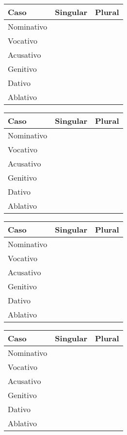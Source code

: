 \documentclass[12pt, twocolumn, a4paper, article]{article}
\numberwithin{equation}{section}
\begin{document}
\begin{table}
\centering
\begin{tabular}[!ht]{|l|p{2.5cm}|p{2.5cm}|} 
\hline \hline
Caso & \multicolumn{1}{c|}{Singular} & \multicolumn{1}{c|}{Plural}  \\
\hline
Nominativo &  & \\ \hline
Vocativo   &  & \\ \hline
Acusativo  &  & \\ \hline
Genitivo   &  & \\ \hline
Dativo     &  & \\ \hline
Ablativo   &  & \\
\hline \hline
\end{tabular}
\end{table}

\begin{table}
\centering
\begin{tabular}[!ht]{|l|p{2.5cm}|p{2.5cm}|} 
\hline \hline
Caso & \multicolumn{1}{c|}{Singular} & \multicolumn{1}{c|}{Plural}  \\
\hline
Nominativo &  & \\ \hline
Vocativo   &  & \\ \hline
Acusativo  &  & \\ \hline
Genitivo   &  & \\ \hline
Dativo     &  & \\ \hline
Ablativo   &  & \\
\hline \hline
\end{tabular}
\end{table}

\begin{table}
\centering
\begin{tabular}[!ht]{|l|p{2.5cm}|p{2.5cm}|} 
\hline \hline
Caso & \multicolumn{1}{c|}{Singular} & \multicolumn{1}{c|}{Plural}  \\
\hline
Nominativo &  & \\ \hline
Vocativo   &  & \\ \hline
Acusativo  &  & \\ \hline
Genitivo   &  & \\ \hline
Dativo     &  & \\ \hline
Ablativo   &  & \\
\hline \hline
\end{tabular}
\end{table}

\begin{table}
\centering
\begin{tabular}[!ht]{|l|p{2.5cm}|p{2.5cm}|} 
\hline \hline
Caso & \multicolumn{1}{c|}{Singular} & \multicolumn{1}{c|}{Plural}  \\
\hline
Nominativo &  & \\ \hline
Vocativo   &  & \\ \hline
Acusativo  &  & \\ \hline
Genitivo   &  & \\ \hline
Dativo     &  & \\ \hline
Ablativo   &  & \\
\hline \hline
\end{tabular}
\end{table}
\end{document}
